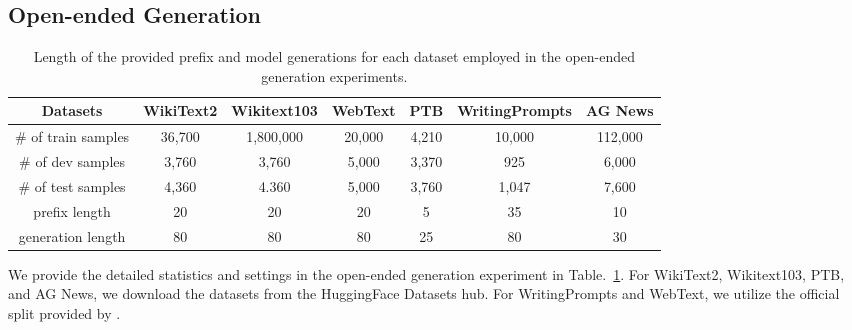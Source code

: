 \subsection{Open-ended Generation}
\label{appendix:a1}
\begin{table}[h!]
    \centering
    \scriptsize
    \begin{tabular}{ccccccc}
    \toprule
    \textbf{Datasets} & \textbf{WikiText2} & \textbf{Wikitext103} & \textbf{WebText} & \textbf{PTB} & \textbf{WritingPrompts} & \textbf{AG News} \\
    \midrule
    \# of train samples     &36,700                   & 1,800,000             & 20,000              &4,210            &10,000                 &112,000                \\
    \# of dev samples     & 3,760                  &  3,760                   & 5,000               &3,370            &925                       &6,000               \\
    \# of test samples     & 4,360                  & 4.360                    &5,000                &3,760           &1,047                       &7,600                \\
    \midrule
    prefix length     & 20                  & 20                    & 20               & 5            & 35                      & 10               \\
    generation length & 80                  & 80                    & 80               & 25           & 80                      & 30               \\
    \bottomrule
    \end{tabular}
    \caption{Length of the provided prefix and model generations for each dataset employed in the open-ended generation experiments.}
    \label{table:stat}
\end{table}
We provide the detailed statistics and settings in the open-ended generation experiment in Table.~\ref{table:stat}. For WikiText2, Wikitext103, PTB, and AG News, we download the datasets from the HuggingFace Datasets hub. For WritingPrompts and WebText, we utilize the official split provided by \cite{mixce}.

